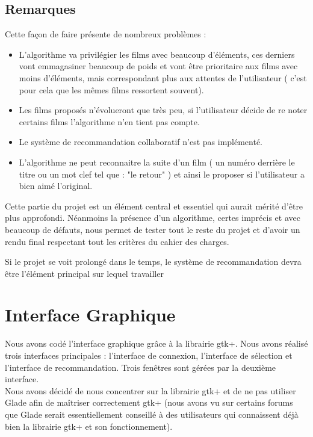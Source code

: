 \documentclass{article}
\begin{document}
\subsection{Remarques}
 Cette façon de faire présente de nombreux problèmes : 
    \begin{itemize}
        \item L'algorithme va privilégier les films avec beaucoup d'éléments, ces derniers vont emmagasiner beaucoup de poids et vont être prioritaire aux films avec moins d'éléments, mais correspondant plus aux attentes de l'utilisateur ( c'est pour cela que les mêmes films ressortent souvent).
        \item Les films proposés n'évolueront que très peu, si l'utilisateur décide de re noter certains films l'algorithme n'en tient pas compte.
        \item Le système de recommandation collaboratif n'est pas implémenté.
        \item L'algorithme ne peut reconnaitre la suite d'un film ( un numéro derrière le titre ou un mot clef tel que : "le retour" ) et ainsi le proposer si l'utilisateur a bien aimé l'original.
    \end{itemize}
    Cette partie du projet est un élément central et essentiel qui aurait mérité d'être plus approfondi. Néanmoins la présence d'un algorithme, certes imprécis et avec beaucoup de défauts, nous permet de tester tout le reste du projet et d'avoir un rendu final respectant tout les critères du cahier des charges.
    \par Si le projet se voit prolongé dans le temps, le système de recommandation devra être l'élément principal sur lequel travailler
\newpage



\section{Interface Graphique}
Nous avons codé l'interface graphique grâce à la librairie gtk+. Nous avons réalisé trois interfaces principales : l'interface de connexion, l'interface de sélection et l'interface de recommandation. Trois fenêtres sont gérées par la deuxième interface.
\noindent
\\ Nous avons décidé de nous concentrer sur la librairie gtk+ et de ne pas utiliser Glade afin de maîtriser correctement gtk+ (nous avons vu sur certains forums que Glade serait essentiellement conseillé à des utilisateurs qui connaissent déjà bien la librairie gtk+ et son fonctionnement).
\end{document}
